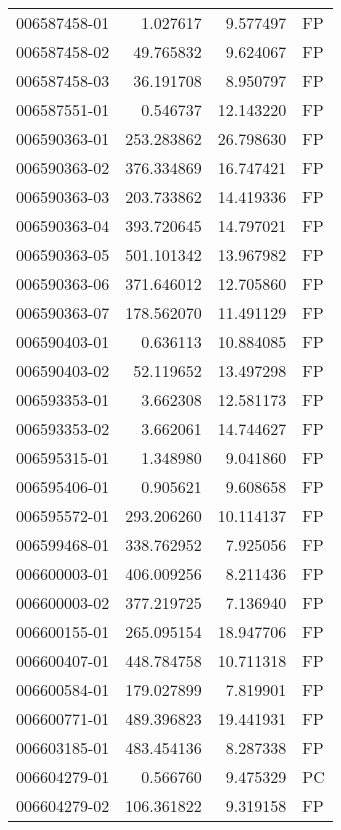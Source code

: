 \begin{tabular}{lrrl}
006587458-01 &    1.027617 &       9.577497 &   FP \\
006587458-02 &   49.765832 &       9.624067 &   FP \\
006587458-03 &   36.191708 &       8.950797 &   FP \\
006587551-01 &    0.546737 &      12.143220 &   FP \\
006590363-01 &  253.283862 &      26.798630 &   FP \\
006590363-02 &  376.334869 &      16.747421 &   FP \\
006590363-03 &  203.733862 &      14.419336 &   FP \\
006590363-04 &  393.720645 &      14.797021 &   FP \\
006590363-05 &  501.101342 &      13.967982 &   FP \\
006590363-06 &  371.646012 &      12.705860 &   FP \\
006590363-07 &  178.562070 &      11.491129 &   FP \\
006590403-01 &    0.636113 &      10.884085 &   FP \\
006590403-02 &   52.119652 &      13.497298 &   FP \\
006593353-01 &    3.662308 &      12.581173 &   FP \\
006593353-02 &    3.662061 &      14.744627 &   FP \\
006595315-01 &    1.348980 &       9.041860 &   FP \\
006595406-01 &    0.905621 &       9.608658 &   FP \\
006595572-01 &  293.206260 &      10.114137 &   FP \\
006599468-01 &  338.762952 &       7.925056 &   FP \\
006600003-01 &  406.009256 &       8.211436 &   FP \\
006600003-02 &  377.219725 &       7.136940 &   FP \\
006600155-01 &  265.095154 &      18.947706 &   FP \\
006600407-01 &  448.784758 &      10.711318 &   FP \\
006600584-01 &  179.027899 &       7.819901 &   FP \\
006600771-01 &  489.396823 &      19.441931 &   FP \\
006603185-01 &  483.454136 &       8.287338 &   FP \\
006604279-01 &    0.566760 &       9.475329 &   PC \\
006604279-02 &  106.361822 &       9.319158 &   FP \\

\end{tabular}
